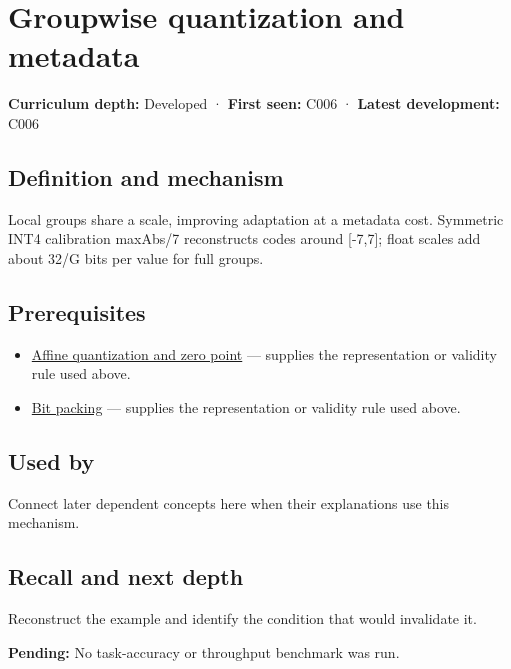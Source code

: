 \hypertarget{appendix-638204c40e8b}{}
\section{Groupwise quantization and metadata}\label{appendix-638204c40e8b-groupwise-quantization-and-metadata}

\textbf{Curriculum depth:} Developed · \textbf{First seen:} C006 · \textbf{Latest development:} C006

\subsection{Definition and mechanism}\label{appendix-638204c40e8b-definition-and-mechanism}

Local groups share a scale, improving adaptation at a metadata cost. Symmetric INT4 calibration maxAbs/7 reconstructs codes around {[}-7,7{]}; float scales add about 32/G bits per value for full groups.

\subsection{Prerequisites}\label{appendix-638204c40e8b-prerequisites}

\begin{itemize}
\tightlist
\item
  \hyperref[appendix-d5da3eaabaef]{Affine quantization and zero point} --- supplies the representation or validity rule used above.
\item
  \hyperref[appendix-1f9963e1a5d1]{Bit packing} --- supplies the representation or validity rule used above.
\end{itemize}

\subsection{Used by}\label{appendix-638204c40e8b-used-by}

Connect later dependent concepts here when their explanations use this mechanism.

\subsection{Recall and next depth}\label{appendix-638204c40e8b-recall-and-next-depth}

Reconstruct the example and identify the condition that would invalidate it.

\textbf{Pending:} No task-accuracy or throughput benchmark was run.

